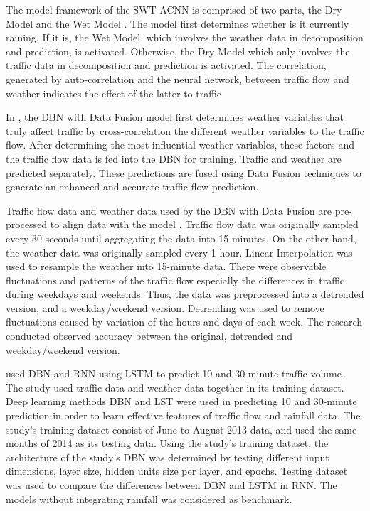 The model framework of the SWT-ACNN is comprised of two parts, the Dry Model and the Wet Model . The model first determines whether is it currently raining. If it is, the Wet Model, which involves the weather data in decomposition and prediction, is activated. Otherwise, the Dry Model which only involves the traffic data in decomposition and prediction is activated. The correlation, generated by auto-correlation and the neural network, between traffic flow and weather indicates the effect of the latter to traffic 

In , the DBN with Data Fusion model first determines weather variables that truly affect traffic by cross-correlation the different weather variables to the traffic flow. After determining the most influential weather variables, these factors and the traffic flow data is fed into the DBN for training. Traffic and weather are predicted separately. These predictions are fused using Data Fusion techniques to generate an enhanced and accurate traffic flow prediction. 

Traffic flow data and weather data used by the DBN with Data Fusion are pre-processed to align data with the model . Traffic flow data was originally sampled every 30 seconds until aggregating the data into 15 minutes. On the other hand, the weather data was originally sampled every 1 hour. Linear Interpolation was used to resample the weather into 15-minute data. There were observable fluctuations and patterns of the traffic flow especially the differences in traffic during weekdays and weekends. Thus, the data was preprocessed into a detrended version, and a weekday/weekend version. Detrending was used to remove fluctuations caused by variation of the hours and days of each week. The research conducted observed accuracy between the original, detrended and weekday/weekend version. 

 used DBN and RNN using LSTM to predict 10 and 30-minute traffic volume. The study used traffic data and weather data together in its training dataset. Deep learning methods DBN and LST were used in predicting 10 and 30-minute prediction in order to learn effective features of traffic flow and rainfall data. The study's training dataset consist of June to August 2013 data, and used the same months of 2014 as its testing data. Using the study's training dataset, the architecture of the study's DBN was determined by testing different input dimensions, layer size, hidden units size per layer, and epochs. Testing dataset was used to compare the differences between DBN and LSTM in RNN. The models without integrating rainfall was considered as benchmark. 

